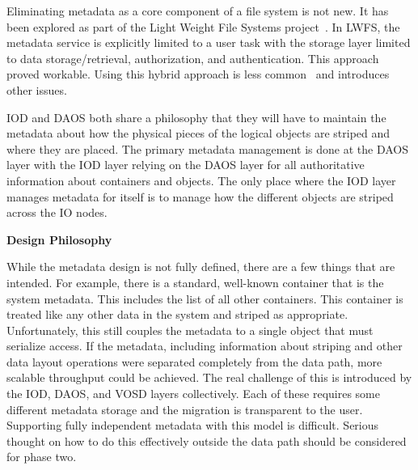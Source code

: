 \documentclass[conference]{IEEEtran}
\begin{document}
Eliminating metadata as a core component of a file system is not new. It has
been explored as part of the Light Weight File Systems
project~\cite{oldfield:lwfs}. In LWFS, the metadata service is explicitly
limited to a user task with the storage layer limited to data
storage/retrieval, authorization, and authentication. This approach proved
workable. Using this hybrid approach is less common~\cite{weil:2006:ceph} and
introduces other issues.

IOD and DAOS both share a philosophy that they will have to maintain the
metadata about how the physical pieces of the logical objects are striped and
where they are placed. The primary metadata management is done at the DAOS
layer with the IOD layer relying on the DAOS layer for all authoritative
information about containers and objects. The only place where the IOD layer
manages metadata for itself is to manage how the different objects are striped
across the IO nodes.

\noindent\textbf{Design Philosophy}

While the metadata design is not fully defined, there are a few things that
are intended. For example, there is a standard, well-known container that is
the system metadata. This includes the list of all other containers. This
container is treated like any other data in the system and striped as
appropriate. Unfortunately, this still couples the metadata to a single object
that must serialize access. If the metadata, including information about
striping and other data layout operations were separated completely from the
data path, more scalable throughput could be achieved. The real challenge of
this is introduced by the IOD, DAOS, and VOSD layers collectively. Each of
these requires some different metadata storage and the migration is transparent
to the user.  Supporting fully independent metadata with this model is
difficult. Serious thought on how to do this effectively outside the data path
should be considered for phase two.
\end{document}
